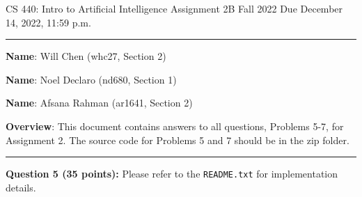 \documentclass[12pt]{article}
\begin{document}
\noindent
CS 440: Intro to Artificial Intelligence \hfill Assignment 2B\newline
Fall 2022 \hfill Due December 14, 2022, 11:59 p.m.

\noindent
\rule{\linewidth}{0.4pt}

\vspace{.5cm}

\textbf{Name}: Will Chen (whc27, Section 2)

\textbf{Name}: Noel Declaro (nd680, Section 1)

\textbf{Name}: Afsana Rahman (ar1641, Section 2)

\vspace{.5cm}

\textbf{Overview}:  This document contains answers to all questions, Problems 5-7, for Assignment 2. The source code for Problems 5 and 7 should be in the zip folder. 

\noindent
\rule{\linewidth}{0.4pt}

\vspace{.5cm}

\textbf{Question 5 (35 points):} Please refer to the \texttt{README.txt} for implementation details.
\end{document}
